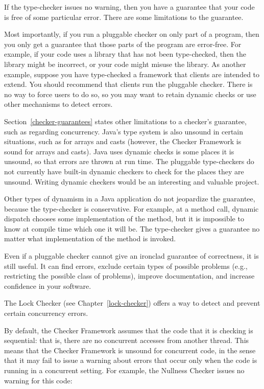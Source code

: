 If the type-checker issues no warning, then you have a guarantee that your
code is free of some particular error.  There are some limitations to the
guarantee.

Most importantly, if you run a pluggable checker on only part of a program, then
you only get a guarantee that those parts of the program are error-free.
For example, if your code uses a library that has not been type-checked,
then the library might be incorrect, or your code might misuse the library.
As another example, suppose you have type-checked a framework that clients
are intended to extend.  You should recommend that clients
run the pluggable checker.  There is no way to force users to do so, so you
may want to retain dynamic checks or use other mechanisms to detect errors.

Section~\ref{checker-guarantees} states other limitations to a checker's
guarantee, such as regarding concurrency.  Java's type system is also
unsound in certain situations, such as for arrays and casts (however, the
Checker Framework is sound for arrays and casts).  Java uses dynamic checks
is some places it is unsound, so that errors are thrown at run time.  The
pluggable type-checkers do not currently have built-in dynamic checkers to
check for the places they are unsound.
Writing dynamic checkers would be an interesting and valuable project.

Other types of dynamism in a Java application do not jeopardize the
guarantee, because the type-checker is conservative.  For example, at a
method call, dynamic dispatch chooses some implementation of the method,
but it is impossible to know at compile time which one it will be.  The
type-checker gives a guarantee no matter what implementation of the method
is invoked.


Even if a pluggable checker cannot give an ironclad
guarantee of correctness, it is still useful.  It can find errors,
exclude certain types of possible problems (e.g., restricting the
possible class of problems), improve documentation, and increase confidence
in your software.



The Lock Checker (see Chapter~\ref{lock-checker}) offers a way to detect
and prevent certain concurrency errors.


By default, the Checker Framework assumes that the code that it is checking
is sequential:  that is, there are no concurrent accesses from another
thread.  This means that the Checker Framework is unsound for concurrent
code, in the sense that it may fail to issue a warning about errors that
occur only when the code is running in a concurrent setting.
For example, the Nullness Checker issues no warning for this
code:

